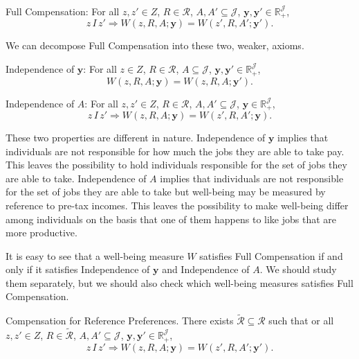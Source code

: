 Full Compensation: For all $z,z'\in Z$, $R\in \mathcal{R}$, $A,A'\subseteq \mathcal{J}$, $\mathbf{y}, \mathbf{y}' \in \mathbb{R}_{+}^{\mathcal{J}}$, 
\begin{equation*}
\label{ }
z\,I\,z'\Rightarrow W(z,R,A;\mathbf{y})=W(z',R,A';\mathbf{y}').
\end{equation*}

We can decompose Full Compensation into these two, weaker, axioms.

Independence of $\mathbf{y}$: For all $z\in Z$, $R\in \mathcal{R}$, $A\subseteq \mathcal{J}$, $\mathbf{y}, \mathbf{y}' \in \mathbb{R}_{+}^{\mathcal{J}}$, 
\begin{equation*}
\label{ }
W(z,R,A;\mathbf{y})=W(z,R,A;\mathbf{y}').
\end{equation*}

Independence of $A$: For all $z,z'\in Z$, $R\in \mathcal{R}$, $A,A'\subseteq \mathcal{J}$, $\mathbf{y}\in \mathbb{R}_{+}^{\mathcal{J}}$, 
\begin{equation*}
\label{ }
z\,I\,z'\Rightarrow W(z,R,A;\mathbf{y})=W(z',R,A';\mathbf{y}).
\end{equation*}

These two properties are different in nature. Independence of $\mathbf{y}$ implies that individuals are not responsible for how much the jobs they are able to take pay. This leaves the possibility to hold individuals responsible for the set of jobs they are able to take. Independence of $A$ implies that individuals are not responsible for the set of jobs they are able to take but well-being may be measured by reference to pre-tax incomes. This leaves the possibility to make well-being differ among individuals on the basis that one of them happens to like jobs that are more productive.

It is easy to see that a well-being measure $W$ satisfies Full Compensation if and only if it satisfies Independence of $\mathbf{y}$ and Independence of $A$. We should study them separately, but we should also check which well-being measures satisfies Full Compensation.

Compensation for Reference Preferences. There exists $\tilde{\mathcal{R}}\subseteq\mathcal{R}$ such that or all $z,z'\in Z$, $R\in \tilde{\mathcal{R}}$, $A,A'\subseteq \mathcal{J}$, $\mathbf{y}, \mathbf{y}' \in \mathbb{R}_{+}^{\mathcal{J}}$, 
\begin{equation*}
\label{ }
z\,I\,z'\Rightarrow W(z,R,A;\mathbf{y})=W(z',R,A';\mathbf{y}').
\end{equation*}

